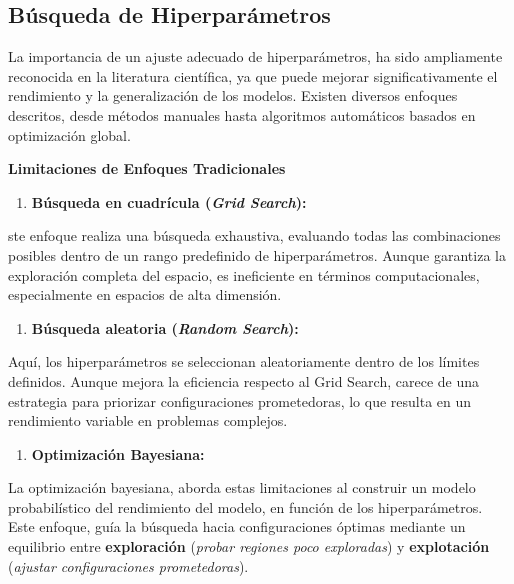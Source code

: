 \documentclass[
  12pt,
  letterpaper,
  DIV=11,
  numbers=noendperiod]{scrartcl}
\providecommand{\tightlist}{%
  \setlength{\itemsep}{0pt}\setlength{\parskip}{0pt}}\usepackage{longtable,booktabs,array}
\begin{document}
\subsection{Búsqueda de
Hiperparámetros}\label{buxfasqueda-de-hiperparuxe1metros}

La importancia de un ajuste adecuado de hiperparámetros, ha sido
ampliamente reconocida en la literatura científica, ya que puede mejorar
significativamente el rendimiento y la generalización de los modelos.
Existen diversos enfoques descritos, desde métodos manuales hasta
algoritmos automáticos basados en optimización global.

\textbf{Limitaciones de Enfoques Tradicionales}

\begin{enumerate}
\def\labelenumi{\arabic{enumi}.}
\tightlist
\item
  \textbf{Búsqueda en cuadrícula (\emph{Grid Search}):}
\end{enumerate}

ste enfoque realiza una búsqueda exhaustiva, evaluando todas las
combinaciones posibles dentro de un rango predefinido de
hiperparámetros. Aunque garantiza la exploración completa del espacio,
es ineficiente en términos computacionales, especialmente en espacios de
alta dimensión.

\begin{enumerate}
\def\labelenumi{\arabic{enumi}.}
\setcounter{enumi}{1}
\tightlist
\item
  \textbf{Búsqueda aleatoria (\emph{Random Search}):}
\end{enumerate}

Aquí, los hiperparámetros se seleccionan aleatoriamente dentro de los
límites definidos. Aunque mejora la eficiencia respecto al Grid Search,
carece de una estrategia para priorizar configuraciones prometedoras, lo
que resulta en un rendimiento variable en problemas complejos.

\begin{enumerate}
\def\labelenumi{\arabic{enumi}.}
\setcounter{enumi}{2}
\tightlist
\item
  \textbf{Optimización Bayesiana:}
\end{enumerate}

La optimización bayesiana, aborda estas limitaciones al construir un
modelo probabilístico del rendimiento del modelo, en función de los
hiperparámetros. Este enfoque, guía la búsqueda hacia configuraciones
óptimas mediante un equilibrio entre \textbf{exploración} (\emph{probar
regiones poco exploradas}) y \textbf{explotación} (\emph{ajustar
configuraciones prometedoras}).
\end{document}
